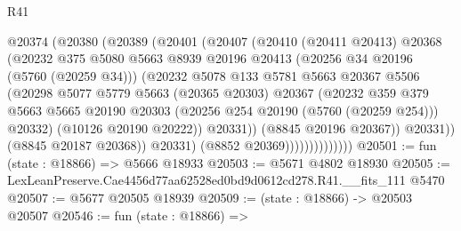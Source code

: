 \begin{lexlean}{R41}
\begin{coremodule}
                            @20374
                              (@20380
                                (@20389
                                  (@20401
                                    (@20407
                                      (@20410
                                        (@20411 @20413)
                                        @20368
                                        (@20232
                                          @375
                                          @5080
                                          @5663
                                          @8939
                                          @20196
                                          @20413
                                          (@20256 @34 @20196 (@5760 (@20259 @34)))
                                          (@20232
                                            @5078
                                            @133
                                            @5781
                                            @5663
                                            @20367
                                            @5506
                                            (@20298
                                              @5077
                                              @5779
                                              @5663
                                              (@20365 @20303)
                                              @20367
                                              (@20232
                                                @359
                                                @379
                                                @5663
                                                @5665
                                                @20190
                                                @20303
                                                (@20256 @254 @20190 (@5760 (@20259 @254)))
                                                @20332)
                                              (@10126 @20190 @20222))
                                            @20331))
                                        (@8845 @20196 @20367))
                                      @20331))
                                  (@8845 @20187 @20368))
                                @20331)
                              (@8852 @20369))))))))))))))
@20501 := fun (state : @18866) => @5666 @18933
@20503 := @5671 @4802 @18930
@20505 := LexLeanPreserve.Cae4456d77aa62528ed0bd9d0612cd278.R41.__fits_111 @5470
@20507 := @5677 @20505 @18939
@20509 := (state : @18866) -> @20503 @20507
@20546 := fun (state : @18866) =>

\end{coremodule}
\end{lexlean}
